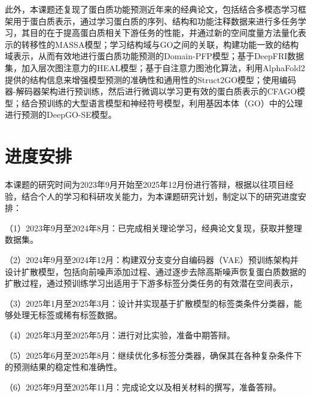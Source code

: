 此外，本课题还复现了蛋白质功能预测近年来的经典论文，包括结合多模态学习框架用于蛋白质表示，通过学习蛋白质的序列、结构和功能注释数据来进行多任务学习，其目的在于提高蛋白质相关下游任务的性能，并通过新的空间度量方法量化表示的转移性的MASSA模型\cite{hu2023multimodal}；学习结构域与GO之间的关联，构建功能一致的结构域表示，从而有效地进行蛋白质功能预测的Domain-PFP模型\cite{ibtehaz2023domain}；基于DeepFRI数据集，加入层次图注意力的HEAL模型\cite{gu2023hierarchical}；基于自注意力图池化算法，利用AlphaFold2提供的结构信息来增强模型预测的准确性和通用性的Struct2GO\cite{jiao2023struct2go}模型；使用编码器-解码器架构进行预训练，然后进行微调以学习更有效的蛋白质表示的CFAGO模型\cite{wu2023cfago}；结合预训练的大型语言模型和神经符号模型，利用基因本体（GO）中的公理进行预测的DeepGO-SE模型\cite{kulmanov2024protein}。


\section{进度安排}
本课题的研究时间为2023年9月开始至2025年12月份进行答辩，根据以往项目经验，结合个人的学习和科研攻关能力，为本课题研究计划，制定以下的研究进度安排：

（1）2023年9月至2024年8月：已完成相关理论学习，经典论文复现，获取并整理数据集。

（2）2024年9月至2024年12月：构建双分支变分自编码器（VAE）预训练架构并设计扩散模型，包括向前噪声添加过程、通过逐步去除高斯噪声恢复蛋白质数据的扩散过程，通过预训练学习出适用于下游多标签分类任务的有效潜在空间表示，

（3）2025年1月至2025年3月：设计并实现基于扩散模型的标签类条件分类器，能够处理无标签或稀有标签数据。

（4）2025年3月至2025年5月：进行对比实验，准备中期答辩。

（5）2025年6月至2025年8月：继续优化多标签分类器，确保其在各种复杂条件下的预测结果的稳定性和准确性。

（6）2025年9月至2025年11月：完成论文以及相关材料的撰写，准备答辩。


